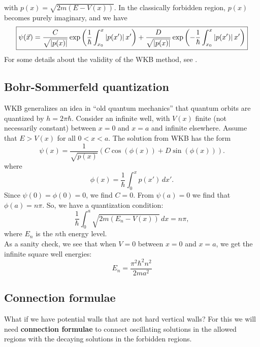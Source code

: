 \documentclass{book}
\theoremstyle{definition}
\newcommand{\f}[2]{\frac{#1}{#2}}
\newcommand{\lp}{\left(}
\newcommand{\rp}{\right)}
\begin{document}
with $p(x) = \sqrt{2m (E - V(x))}$. In the classically forbidden region, $p(x)$ becomes purely imaginary, and we have
\begin{equation*}
\boxed{\psi(\vec{x}) = \f{C}{\sqrt{\abs{p(x)}}} \exp\lp \f{1}{\hbar}\int_{x_0}^x\abs{ p(x')}\,x' \rp  + \f{D}{\sqrt{\abs{p(x)}}} \exp\lp -\f{1}{\hbar}\int_{x_0}^x \abs{p(x')}\,x' \rp    }
\end{equation*}
For some details about the validity of the WKB method, see \cite{harrow8}. \\



\subsection*{Bohr-Sommerfeld quantization}
WKB generalizes an idea in ``old quantum mechanics'' that quantum orbits are quantized by $h = 2\pi \hbar$. Consider an infinite well, with $V(x)$ finite (not necessarily constant) between $x=0$ and $x=a$ and infinite elsewhere. Assume that $E > V(x)$ for all  $0 < x < a$. The solution from WKB has the form 
\begin{equation*}
\psi(x) = \f{1}{\sqrt{p(x)}} (C\cos(\phi(x)) + D\sin(\phi(x))). 
\end{equation*}
where 
\begin{equation*}
\phi(x) = \f{1}{\hbar}\int_{0}^x p(x')\,dx'.
\end{equation*}
Since $\psi(0) = \phi(0) = 0$, we find $C =0$. From $\psi(a) = 0$ we find that $\phi(a) = n\pi$. So, we have a quantization condition:
\begin{equation*}
\f{1}{\hbar}\int_0^a \sqrt{2m (E_n - V(x))}\,dx = n\pi,
\end{equation*}
where $E_n$ is the $n$th energy level. \\

As a sanity check, we see that when $V =0 $ between $x = 0$ and $x=a$, we get the infinite square well energies:
\begin{equation*}
E_n = \f{\pi^2 \hbar^2 n^2}{2ma^2}
\end{equation*}




\subsection*{Connection formulae}
What if we have potential walls that are not hard vertical walls? For this we will need \textbf{connection formulae}  to connect oscillating solutions in the allowed regions with the decaying solutions in the forbidden regions. 
\end{document}
